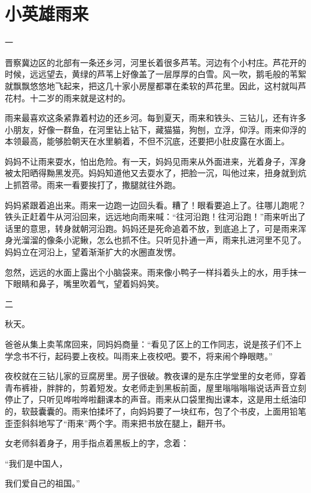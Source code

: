 \documentclass[12pt,UTF-8,openany]{ctexbook}
\begin{document}
\chapter{小英雄雨来}

\begin{large}
    
    一
    
    晋察冀边区的北部有一条还乡河，河里长着很多芦苇。河边有个小村庄。芦花开的时候，远远望去，黄绿的芦苇上好像盖了一层厚厚的白雪。风一吹，鹅毛般的苇絮就飘飘悠悠地飞起来，把这几十家小房屋都罩在柔软的芦花里。因此，这村就叫芦花村。十二岁的雨来就是这村的。
    
    雨来最喜欢这条紧靠着村边的还乡河。每到夏天，雨来和铁头、三钻儿，还有许多小朋友，好像一群鱼，在河里钻上钻下，藏猫猫，狗刨，立浮，仰浮。雨来仰浮的本领最高，能够脸朝天在水里躺着，不但不沉底，还要把小肚皮露在水面上。
    
    妈妈不让雨来耍水，怕出危险。有一天，妈妈见雨来从外面进来，光着身子，浑身被太阳晒得黝黑发亮。妈妈知道他又去耍水了，把脸一沉，叫他过来，扭身就到炕上抓笤帚。雨来一看要挨打了，撒腿就往外跑。
    
    妈妈紧跟着追出来。雨来一边跑一边回头看。糟了！眼看要追上了。往哪儿跑呢？铁头正赶着牛从河沿回来，远远地向雨来喊：“往河沿跑！往河沿跑！”雨来听出了话里的意思，转身就朝河沿跑。妈妈还是死命追着不放，到底追上了，可是雨来浑身光溜溜的像条小泥鳅，怎么也抓不住。只听见扑通一声，雨来扎进河里不见了。妈妈立在河沿上，望着渐渐扩大的水圈直发愣。
    
    忽然，远远的水面上露出个小脑袋来。雨来像小鸭子一样抖着头上的水，用手抹一下眼睛和鼻子，嘴里吹着气，望着妈妈笑。
    
    二
    
    秋天。
    
    爸爸从集上卖苇席回来，同妈妈商量：“看见了区上的工作同志，说是孩子们不上学念书不行，起码要上夜校。叫雨来上夜校吧。要不，将来闹个睁眼瞎。”
    
    夜校就在三钻儿家的豆腐房里。房子很破。教夜课的是东庄学堂里的女老师，穿着青布裤褂，胖胖的，剪着短发。女老师走到黑板前面，屋里嗡嗡嗡嗡说话声音立刻停止了，只听见哗啦哗啦翻课本的声音。雨来从口袋里掏出课本，这是用土纸油印的，软鼓囊囊的。雨来怕揉坏了，向妈妈要了一块红布，包了个书皮，上面用铅笔歪歪斜斜地写了“雨来”两个字。雨来把书放在腿上，翻开书。
    
    女老师斜着身子，用手指点着黑板上的字，念着：
    
    “我们是中国人，
    
    我们爱自己的祖国。”
    

\end{large}
\end{document}

